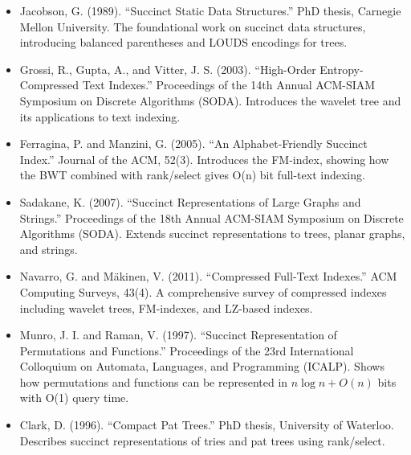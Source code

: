 \begin{itemize}
\item Jacobson, G. (1989). ``Succinct Static Data Structures.'' PhD thesis, Carnegie Mellon University. The foundational work on succinct data structures, introducing balanced parentheses and LOUDS encodings for trees.

\item Grossi, R., Gupta, A., and Vitter, J. S. (2003). ``High-Order Entropy-Compressed Text Indexes.'' Proceedings of the 14th Annual ACM-SIAM Symposium on Discrete Algorithms (SODA). Introduces the wavelet tree and its applications to text indexing.

\item Ferragina, P. and Manzini, G. (2005). ``An Alphabet-Friendly Succinct Index.'' Journal of the ACM, 52(3). Introduces the FM-index, showing how the BWT combined with rank/select gives O(n) bit full-text indexing.

\item Sadakane, K. (2007). ``Succinct Representations of Large Graphs and Strings.'' Proceedings of the 18th Annual ACM-SIAM Symposium on Discrete Algorithms (SODA). Extends succinct representations to trees, planar graphs, and strings.

\item Navarro, G. and M\"akinen, V. (2011). ``Compressed Full-Text Indexes.'' ACM Computing Surveys, 43(4). A comprehensive survey of compressed indexes including wavelet trees, FM-indexes, and LZ-based indexes.

\item Munro, J. I. and Raman, V. (1997). ``Succinct Representation of Permutations and Functions.'' Proceedings of the 23rd International Colloquium on Automata, Languages, and Programming (ICALP). Shows how permutations and functions can be represented in $n \log n + O(n)$ bits with O(1) query time.

\item Clark, D. (1996). ``Compact Pat Trees.'' PhD thesis, University of Waterloo. Describes succinct representations of tries and pat trees using rank/select.
\end{itemize}
